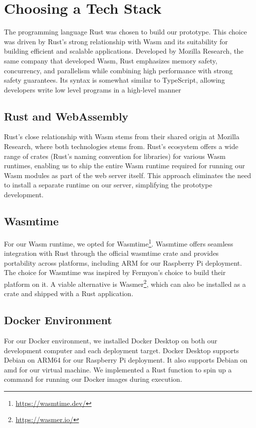\documentclass[
  table]{report}
\begin{document}
\section{Choosing a Tech Stack}
\label{sect:tech_stack}

The programming language Rust was chosen to build our prototype. This
choice was driven by Rust's strong relationship with \ac{Wasm} and its
suitability for building efficient and scalable applications. Developed
by Mozilla Research, the same company that developed \ac{Wasm}, Rust
emphasizes memory safety, concurrency, and parallelism while combining
high performance with strong safety guarantees. Its syntax is somewhat
similar to TypeScript, allowing developers write low level programs in a
high-level manner

\subsection{Rust and WebAssembly}

Rust's close relationship with \ac{Wasm} stems from their shared origin
at Mozilla Research, where both technologies stems from. Rust's
ecosystem offers a wide range of crates (Rust's naming convention for
libraries) for various \ac{Wasm} runtimes, enabling us to ship the
entire Wasm runtime required for running our Wasm modules as part of the
web server itself. This approach eliminates the need to install a
separate runtime on our server, simplifying the prototype development.

\subsection{Wasmtime}

For our \ac{Wasm} runtime, we opted for Wasmtime\footnote{\url{https://wasmtime.dev/}}.
Wasmtime offers seamless integration with Rust through the official
wasmtime crate and provides portability across platforms, including ARM
for our Raspberry Pi deployment. The choice for Wasmtime was inspired by
Fermyon's choice to build their platform on it. A viable alternative is
Wasmer\footnote{\url{https://wasmer.io/}}, which can also be installed
as a crate and shipped with a Rust application.

\subsection{Docker Environment}

For our Docker environment, we installed Docker Desktop on both our
development computer and each deployment target. Docker Desktop supports
Debian on ARM64 for our Raspberry Pi deployment. It also supports Debian
on amd for our virtual machine. We implemented a Rust function to spin
up a command for running our Docker images during execution.
\end{document}
